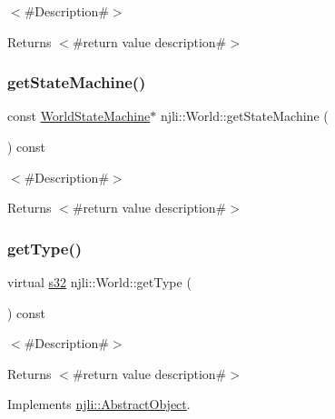 $<$\#\+Description\#$>$

\begin{DoxyReturn}{Returns}
$<$\#return value description\#$>$ 
\end{DoxyReturn}
\mbox{\label{classnjli_1_1_world_aa78f8be7d30ab1d38cea248c3017f0a7}} 
\subsubsection{\texorpdfstring{get\+State\+Machine()}{getStateMachine()}\hspace{0.1cm}{\footnotesize\ttfamily [2/2]}}
{\footnotesize\ttfamily const \mbox{\hyperlink{classnjli_1_1_world_state_machine}{World\+State\+Machine}}$\ast$ njli\+::\+World\+::get\+State\+Machine (\begin{DoxyParamCaption}{ }\end{DoxyParamCaption}) const}

$<$\#\+Description\#$>$

\begin{DoxyReturn}{Returns}
$<$\#return value description\#$>$ 
\end{DoxyReturn}
\mbox{\label{classnjli_1_1_world_a35e88a33b35fa6de44f10e3a93a62468}} 
\subsubsection{\texorpdfstring{get\+Type()}{getType()}}
{\footnotesize\ttfamily virtual \mbox{\hyperlink{_util_8h_aa62c75d314a0d1f37f79c4b73b2292e2}{s32}} njli\+::\+World\+::get\+Type (\begin{DoxyParamCaption}{ }\end{DoxyParamCaption}) const\hspace{0.3cm}{\ttfamily [virtual]}}

$<$\#\+Description\#$>$

\begin{DoxyReturn}{Returns}
$<$\#return value description\#$>$ 
\end{DoxyReturn}


Implements \mbox{\hyperlink{classnjli_1_1_abstract_object_a08dcf202a47f0782813b8bc98c659e78}{njli\+::\+Abstract\+Object}}.

